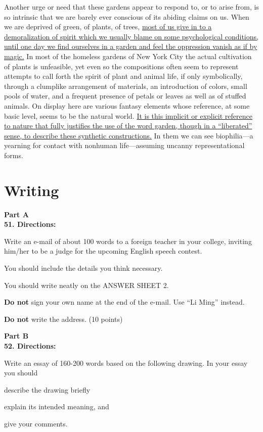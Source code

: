 Another urge or need that these gardens appear to respond to, or to
arise from, is so intrinsic that we are barely ever conscious of its
abiding claims on us. When we are deprived of green, of plants, of
trees, \transnum \uline{ most of us give in to a demoralization of spirit
	which we usually blame on some psychological conditions, until one day
	we find ourselves in a garden and feel the oppression vanish as if by
	magic.} In most of the homeless gardens of New York City the actual
cultivation of plants is unfeasible, yet even so the compositions often
seem to represent attempts to call forth the spirit of plant and animal
life, if only symbolically, through a clumplike arrangement of
materials, an introduction of colors, small pools of water, and a
frequent presence of petals or leaves as well as of stuffed animals. On
display here are various fantasy elements whose reference, at some basic
level, seems to be the natural world. \transnum \uline{It is this
	implicit or explicit reference to nature that fully justifies the use of
	the word garden, though in a ``liberated''
	sense, to describe these synthetic constructions.} In them we can see
biophilia---a yearning for contact with nonhuman life---assuming uncanny
representational forms.

\newpage

\section{Writing}


\noindent
\textbf{Part A}\\
\textbf{51. Directions:}

Write an e-mail of about 100 words to a foreign teacher in your college,
inviting him/her to be a judge for the upcoming English speech contest.

You should include the details you think necessary.

You should write neatly on the ANSWER SHEET 2.

\textbf{Do not} sign your own name at the end of the e-mail. Use ``Li Ming''
instead.

\textbf{Do not} write the address. (10 points)



\vspace{3em}

\noindent
\textbf{Part B}\\
\textbf{52. Directions:}

Write an essay of 160-200 words based on the following drawing. In your
essay you should
\begin{listwrite}
	\item
	describe the drawing briefly

\item 
 explain its intended meaning, and

\item 
 give your comments.
\end{listwrite}

